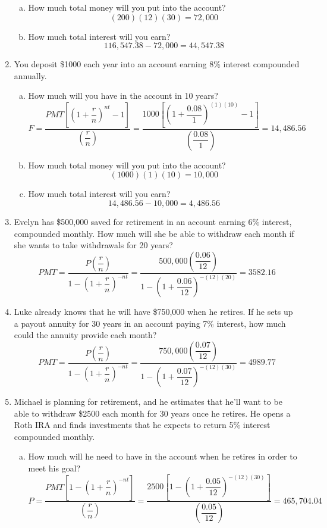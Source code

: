 \begin{enumerate}
\begin{enumerate}[(a)]
\item How much total money will you put into the account? 
\[(200)(12)(30) = 72,000\]

\item How much total interest will you earn? 
\[116,547.38 - 72,000 = 44,547.38\]
\end{enumerate}
\pagebreak

\item You deposit \$1000 each year into an account earning 8\% interest compounded annually.
\begin{enumerate}[(a)]
\item How much will you have in the account in 10 years? 
\[F=\dfrac{PMT\left[\left(1+\dfrac{r}{n}\right)^{nt}-1\right]}{\left(\dfrac{r}{n}\right)} = \dfrac{1000\left[\left(1+\dfrac{0.08}{1}\right)^{(1)(10)}-1\right]}{\left(\dfrac{0.08}{1}\right)} = 14,486.56\]

\item How much total money will you put into the account? 
\[(1000)(1)(10) = 10,000\]

\item How much total interest will you earn? 
\[14,486.56 - 10,000 = 4,486.56\]
\end{enumerate}

\item Evelyn has \$500,000 saved for retirement in an account earning 6\% interest, compounded monthly.  How much will she be able to withdraw each month if she wants to take withdrawals for 20 years? 
\[PMT = \dfrac{P\left(\dfrac{r}{n}\right)}{1-\left(1+\dfrac{r}{n}\right)^{-nt}} = \dfrac{500,000\left(\dfrac{0.06}{12}\right)}{1-\left(1+\dfrac{0.06}{12}\right)^{-(12)(20)}} = 3582.16\]

\item Luke already knows that he will have \$750,000 when he retires.  If he sets up a payout annuity for 30 years in an account paying 7\% interest, how much could the annuity provide each month? 
\[PMT = \dfrac{P\left(\dfrac{r}{n}\right)}{1-\left(1+\dfrac{r}{n}\right)^{-nt}} = \dfrac{750,000\left(\dfrac{0.07}{12}\right)}{1-\left(1+\dfrac{0.07}{12}\right)^{-(12)(30)}} = 4989.77\]

\item Michael is planning for retirement, and he estimates that he'll want to be able to withdraw \$2500 each month for 30 years once he retires.  He opens a Roth IRA and finds investments that he expects to return 5\% interest compounded monthly.
\begin{enumerate}[(a)]
\item How much will he need to have in the account when he retires in order to meet his goal? 
\[P = \dfrac{PMT\left[1-\left(1+\dfrac{r}{n}\right)^{-nt}\right]}{\left(\dfrac{r}{n}\right)} = \dfrac{2500\left[1-\left(1+\dfrac{0.05}{12}\right)^{-(12)(30)}\right]}{\left(\dfrac{0.05}{12}\right)} = 465,704.04\]


\end{enumerate}
\end{enumerate}
